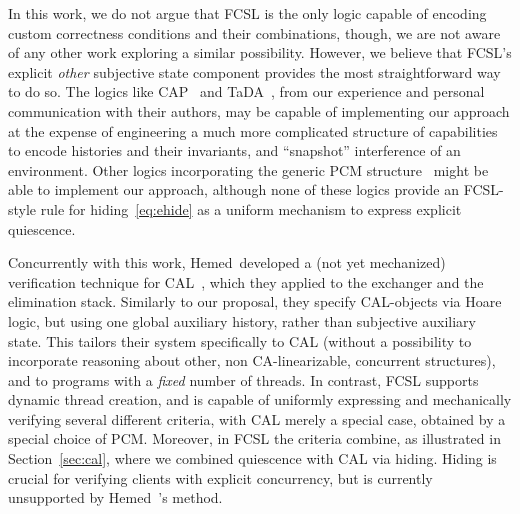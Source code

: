 In this work, we do not argue that FCSL is the only logic capable of
encoding custom correctness conditions and their combinations, though,
we are not aware of any other work exploring a similar possibility.
%
However, we believe that FCSL's explicit \emph{other}
subjective state component provides the most straightforward way to do
so.
%
The logics like CAP~\cite{DinsdaleYoung-al:ECOOP10} and
TaDA~\cite{ArrozPincho-al:ECOOP14}, from our experience and personal
communication with their authors, may be capable of implementing our
approach at the expense of engineering a much more complicated
structure of capabilities to encode histories and their invariants,
and ``snapshot'' interference of an environment.
%
Other logics incorporating the generic PCM
structure~\cite{Raad-al:ESOP15,Jung-al:POPL15,Jung-al:ICFP16,Turon-al:OOPSLA14}
might be able to implement our approach, although none of these logics
provide an FCSL-style rule for hiding~\eqref{eq:ehide} as a uniform
mechanism to express explicit quiescence.


Concurrently with this work, Hemed~\etal developed a (not yet
mechanized) verification technique for CAL~\cite{Hemed-al:DISC15},
which they applied to the exchanger and the elimination
stack. Similarly to our proposal, they specify CAL-objects via Hoare
logic, but using one global auxiliary history, rather than subjective
auxiliary state. 
%
This tailors their system specifically to CAL (without a possibility
to incorporate reasoning about other, non CA-linearizable, concurrent
structures), and to programs with a \emph{fixed} number of threads. In
contrast, FCSL supports dynamic thread creation, and is capable of
uniformly expressing and mechanically verifying several different
criteria, with CAL merely a special case, obtained by a special choice
of PCM. Moreover, in FCSL the criteria combine, as illustrated in
Section~\ref{sec:cal}, where we combined quiescence with CAL via
hiding. Hiding is crucial for verifying clients with explicit
concurrency, but is currently unsupported by Hemed~\etal's method.
%

